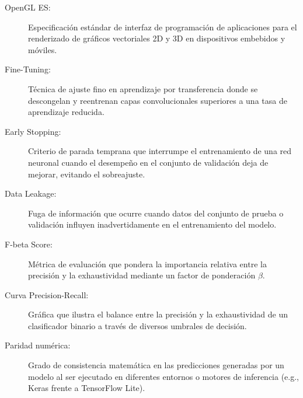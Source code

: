 \begin{description}
    \item[OpenGL ES:] Especificación estándar de interfaz de programación de aplicaciones para el renderizado de gráficos vectoriales 2D y 3D en dispositivos embebidos y móviles.
    \item[Fine-Tuning:] Técnica de ajuste fino en aprendizaje por transferencia donde se descongelan y reentrenan capas convolucionales superiores a una tasa de aprendizaje reducida.
    \item[Early Stopping:] Criterio de parada temprana que interrumpe el entrenamiento de una red neuronal cuando el desempeño en el conjunto de validación deja de mejorar, evitando el sobreajuste.
    \item[Data Leakage:] Fuga de información que ocurre cuando datos del conjunto de prueba o validación influyen inadvertidamente en el entrenamiento del modelo.
    \item[F-beta Score:] Métrica de evaluación que pondera la importancia relativa entre la precisión y la exhaustividad mediante un factor de ponderación $\beta$.
    \item[Curva Precision-Recall:] Gráfica que ilustra el balance entre la precisión y la exhaustividad de un clasificador binario a través de diversos umbrales de decisión.
    \item[Paridad numérica:] Grado de consistencia matemática en las predicciones generadas por un modelo al ser ejecutado en diferentes entornos o motores de inferencia (e.g., Keras frente a TensorFlow Lite).
\end{description}







